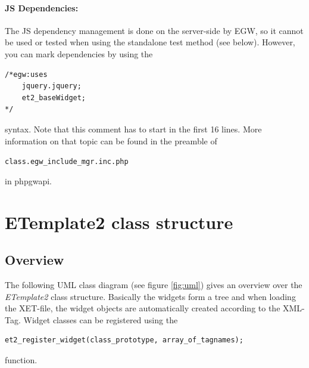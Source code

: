 \documentclass[10pt,a4paper]{report}
\begin{document}
\paragraph{JS Dependencies:}
The JS dependency management is done on the server-side by EGW, so it cannot be used or tested when using the standalone test method (see below). However, you can mark dependencies by using the
\begin{verbatim}
/*egw:uses
    jquery.jquery;
    et2_baseWidget;
*/
\end{verbatim}
syntax. Note that this comment has to start in the first 16 lines. More information on that topic can be found in the preamble of 

\begin{center}\texttt{class.egw\_include\_mgr.inc.php}\end{center}

in phpgwapi.


\section*{ETemplate2 class structure}

\subsection*{Overview}
The following UML class diagram (see figure \ref{fig:uml}) gives an overview over the \textit{ETemplate2} class structure. Basically the widgets form a tree and when loading the XET-file, the widget objects are automatically created according to the XML-Tag. Widget classes can be registered using the
\begin{verbatim}
et2_register_widget(class_prototype, array_of_tagnames);
\end{verbatim}
function.
\end{document}
